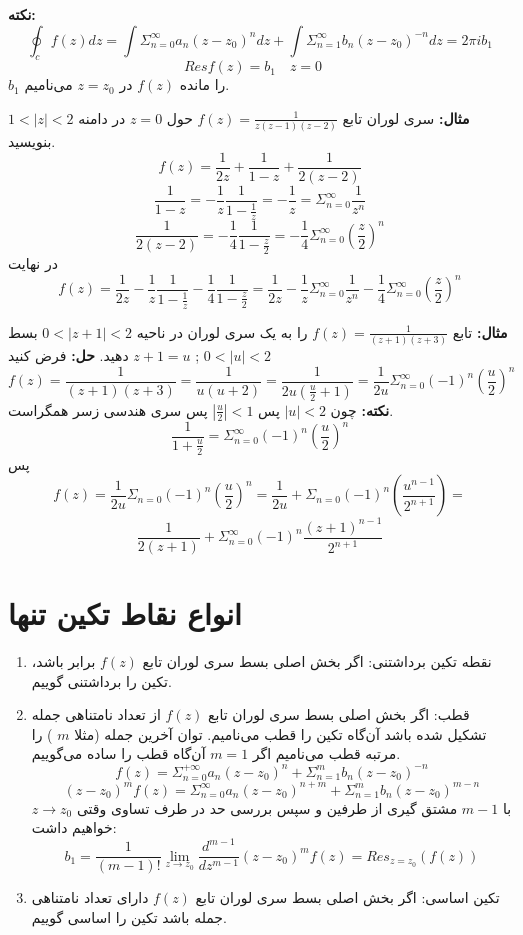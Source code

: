 \documentclass[12pt]{report}
\begin{document}
\textbf{نکته:}
$$\oint_{c} f(z) dz = \int \Sigma_{n = 0}^{\infty} a_n(z- z_0)^n dz + \int \Sigma_{n = 1}^{\infty} b_n(z- z_0)^{-n} dz = 2\pi i b_1$$
$$Res f(z) = b_1 \quad z = 0 \quad$$
$b_1$
را مانده 
$f(z)$
در
$z = z_0$
می‌نامیم.
\newline

\textbf{مثال:}
سری لوران تابع 
$f(z) = \frac{1}{z(z - 1) (z- 2)}$
حول 
$z = 0$
در دامنه 
$1 < |z|< 2$
بنویسید.
$$f(z) = \frac{1}{2z} + \frac{1}{1 - z} + \frac{1}{2(z - 2)}$$
$$\frac{1}{1 - z} = - \frac{1}{z} \frac{1}{1 - \frac{1}{z}} = -\frac{1}{z} = \Sigma_{n = 0}^{\infty} 
\frac{1}{z^n}$$
$$\frac{1}{2(z - 2)} = -\frac{1}{4} \frac{1}{1 - \frac{z}{2}} = - \frac{1}{4} \Sigma_{n = 0}^{\infty} (\frac{z}{2})^n$$
در نهایت
$$f(z) = \frac{1}{2z}  -\frac{1}{z} \frac{1}{1 - \frac{1}{z}}-\frac{1}{4} \frac{1}{1 - \frac{z}{2}} = \frac{1}{2z} - \frac{1}{z} \Sigma_{n = 0}^{\infty} \frac{1}{z^n} - \frac{1}{4}\Sigma_{n = 0}^{\infty} (\frac{z}{2})^n$$
\newline

\textbf{مثال:}
تابع
$f(z) = \frac{1}{(z+ 1)(z+ 3)}$
را به یک سری لوران در ناحیه 
$0< |z+ 1|< 2$
بسط دهید.
\textbf{حل:}
فرض کنید
$z + 1 = u$
;
$0<|u|<2$
$$f(z) = \frac{1}{(z+ 1)(z+3)} = \frac{1}{u(u + 2)} = \frac{1}{2u(\frac{u}{2} + 1)} = \frac{1}{2u} \Sigma_{n = 0}^{\infty} (-1)^n(\frac{u}{2})^n$$
\textbf{نکته:}
چون
$|u|< 2$
پس
$|\frac{u}{2}|< 1$
پس سری هندسی زسر همگراست.
$$\frac{1}{1 + \frac{u}{2}} = \Sigma_{n = 0}^{\infty} (-1)^n(\frac{u}{2})^n$$
پس
$$f(z) = \frac{1}{2u}\Sigma_{n = 0}(-1)^n(\frac{u}{2})^n = \frac{1}{2u} + \Sigma_{n = 0}(-1)^n(\frac{u^{n - 1}}{2^{n+1}}) = $$
$$\frac{1}{2(z+ 1)} + \Sigma_{n = 0}^{\infty} (-1)^n \frac{(z+ 1)^{n - 1}}{2^{n + 1}}$$

\section{انواع نقاط تکین تنها}
\begin{enumerate}
	\item
	نقطه تکین برداشتنی: اگر بخش اصلی بسط سری لوران تابع
	$f(z)$
	برابر باشد، تکین را برداشتنی گوییم.
	\item
	قطب: اگر بخش اصلی بسط سری لوران تابع
	$f(z)$
	از تعداد نامتناهی جمله تشکیل شده باشد آن‌گاه تکین را قطب می‌نامیم. توان آخرین جمله 
	(مثلا
	$m$
	)
	را مرتبه قطب می‌نامیم اگر 
	$m = 1$
	آن‌گاه قطب را ساده می‌گوییم.
	$$f(z) = \Sigma_{n = 0}^{+\infty} a_n(z - z_0)^n + \Sigma_{n = 1}^{m} b_n (z - z_0)^{-n}$$
	$$(z - z_0)^m f(z) = \Sigma_{n = 0}^{\infty} a_n(z - z_0)^{n+ m} + \Sigma_{n = 1}^{m} b_n (z - z_0)^{m-n}$$
	با 
	$m - 1$
	مشتق گیری از طرفین و سپس بررسی حد در طرف تساوی وقتی
	$z \to z_0$
	خواهیم داشت:
	$$b_1 = \frac{1}{(m - 1)!} \lim_{z \to z_0} \frac{d^{m - 1}}{d z^{m - 1}}(z - z_0)^m f(z) = Res_{z = z_0}(f(z))$$
	
	\item
	تکین اساسی: اگر بخش اصلی بسط سری لوران تابع
	$f(z)$
	دارای  تعداد نامتناهی جمله باشد تکین را اساسی گوییم.
	
	
\end{enumerate}
\newline
\end{document}
